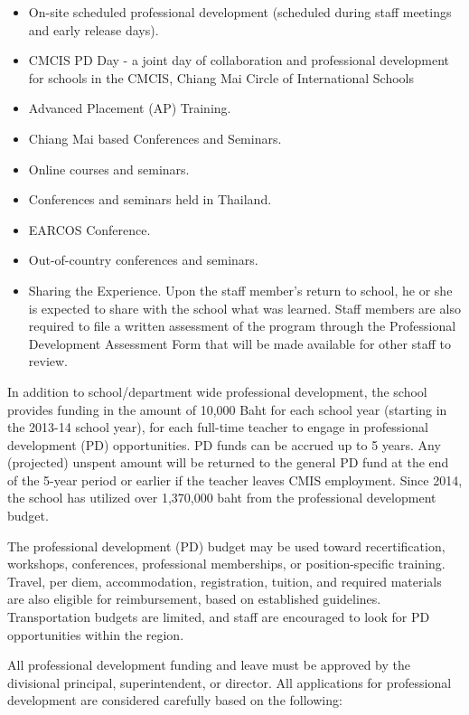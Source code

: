 \begin{itemize}
\item On-site scheduled professional development (scheduled during staff meetings and early release days).
\item CMCIS  PD Day - a joint day of collaboration and professional development for schools in the CMCIS, Chiang Mai Circle of International Schools
\item Advanced Placement (AP) Training.  
\item Chiang Mai based Conferences and Seminars. 
\item Online courses and seminars.  
\item Conferences and seminars held in Thailand. 
\item EARCOS Conference.
\item  Out-of-country conferences and seminars. 
\item Sharing the Experience.  Upon the staff member’s return to school, he or she is expected to share with the school what was learned.  Staff members are also required to file a written assessment of the program through the Professional Development Assessment Form that will be made available for other staff to review.
\end{itemize}



In addition to school/department wide professional development, the school provides funding in the amount of 10,000 Baht for each school year (starting in the 2013-14 school year), for each full-time teacher to engage in professional development (PD) opportunities.  PD funds can be accrued up to 5 years. Any (projected) unspent amount will be returned to the general PD fund at the end of the 5-year period or earlier if the teacher leaves CMIS employment. Since 2014, the school has utilized over 1,370,000 baht from the professional development budget.

The professional development (PD) budget may be used toward recertification, workshops, conferences, professional memberships, or position-specific training.  Travel, per diem, accommodation, registration, tuition, and required materials are also eligible for reimbursement, based on established guidelines.  Transportation budgets are limited, and staff are encouraged to look for PD opportunities within the region.  

All professional development funding and leave must be approved by the divisional principal, superintendent, or director.  All applications for professional development are considered carefully based on the following:

